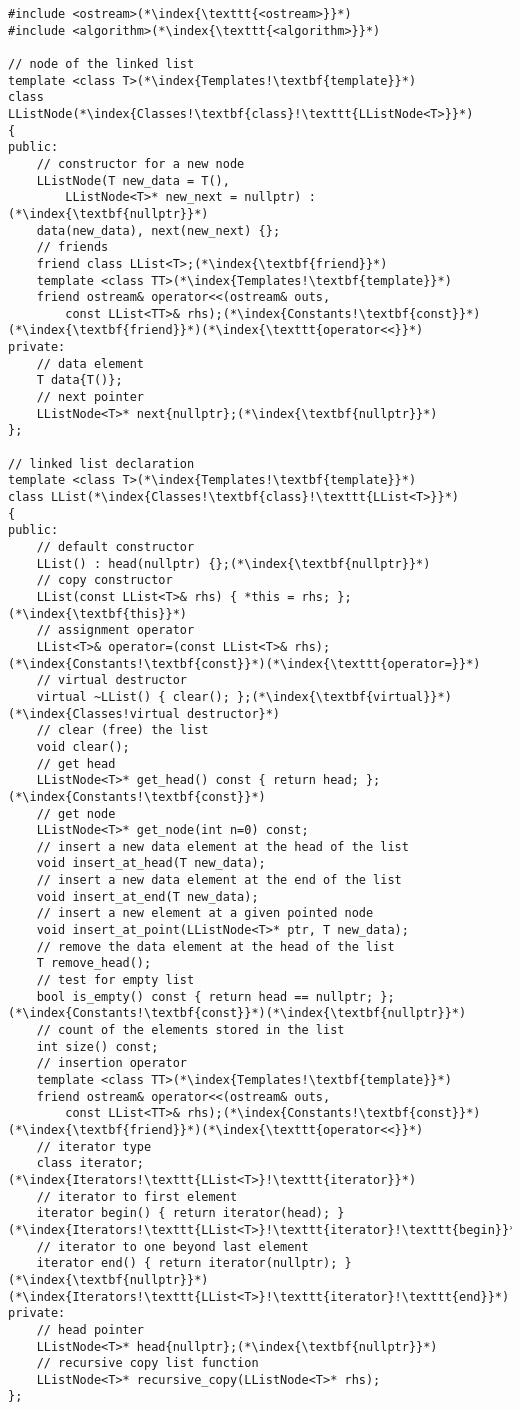 \documentclass[10pt]{book}
\begin{document}
\begin{lstlisting}
#include <ostream>(*\index{\texttt{<ostream>}}*)
#include <algorithm>(*\index{\texttt{<algorithm>}}*)

// node of the linked list
template <class T>(*\index{Templates!\textbf{template}}*)
class LListNode(*\index{Classes!\textbf{class}!\texttt{LListNode<T>}}*)
{
public:
    // constructor for a new node
    LListNode(T new_data = T(),
        LListNode<T>* new_next = nullptr) :(*\index{\textbf{nullptr}}*)
    data(new_data), next(new_next) {};
    // friends
    friend class LList<T>;(*\index{\textbf{friend}}*)
    template <class TT>(*\index{Templates!\textbf{template}}*)
    friend ostream& operator<<(ostream& outs,
        const LList<TT>& rhs);(*\index{Constants!\textbf{const}}*)(*\index{\textbf{friend}}*)(*\index{\texttt{operator<<}}*)
private:
    // data element
    T data{T()};
    // next pointer
    LListNode<T>* next{nullptr};(*\index{\textbf{nullptr}}*)
};

// linked list declaration
template <class T>(*\index{Templates!\textbf{template}}*)
class LList(*\index{Classes!\textbf{class}!\texttt{LList<T>}}*)
{
public:
    // default constructor
    LList() : head(nullptr) {};(*\index{\textbf{nullptr}}*)
    // copy constructor
    LList(const LList<T>& rhs) { *this = rhs; };(*\index{\textbf{this}}*)
    // assignment operator
    LList<T>& operator=(const LList<T>& rhs);(*\index{Constants!\textbf{const}}*)(*\index{\texttt{operator=}}*)
    // virtual destructor
    virtual ~LList() { clear(); };(*\index{\textbf{virtual}}*)(*\index{Classes!virtual destructor}*)
    // clear (free) the list
    void clear();
    // get head
    LListNode<T>* get_head() const { return head; };(*\index{Constants!\textbf{const}}*)
    // get node
    LListNode<T>* get_node(int n=0) const;
    // insert a new data element at the head of the list
    void insert_at_head(T new_data);
    // insert a new data element at the end of the list
    void insert_at_end(T new_data);
    // insert a new element at a given pointed node
    void insert_at_point(LListNode<T>* ptr, T new_data);
    // remove the data element at the head of the list
    T remove_head();
    // test for empty list
    bool is_empty() const { return head == nullptr; };(*\index{Constants!\textbf{const}}*)(*\index{\textbf{nullptr}}*)
    // count of the elements stored in the list
    int size() const;
    // insertion operator
    template <class TT>(*\index{Templates!\textbf{template}}*)
    friend ostream& operator<<(ostream& outs,
        const LList<TT>& rhs);(*\index{Constants!\textbf{const}}*)(*\index{\textbf{friend}}*)(*\index{\texttt{operator<<}}*)
    // iterator type
    class iterator;(*\index{Iterators!\texttt{LList<T>}!\texttt{iterator}}*)
    // iterator to first element
    iterator begin() { return iterator(head); }(*\index{Iterators!\texttt{LList<T>}!\texttt{iterator}!\texttt{begin}}*)
    // iterator to one beyond last element
    iterator end() { return iterator(nullptr); }(*\index{\textbf{nullptr}}*)(*\index{Iterators!\texttt{LList<T>}!\texttt{iterator}!\texttt{end}}*)
private:
    // head pointer
    LListNode<T>* head{nullptr};(*\index{\textbf{nullptr}}*)
    // recursive copy list function
    LListNode<T>* recursive_copy(LListNode<T>* rhs);
};
\end{lstlisting}
\end{document}
